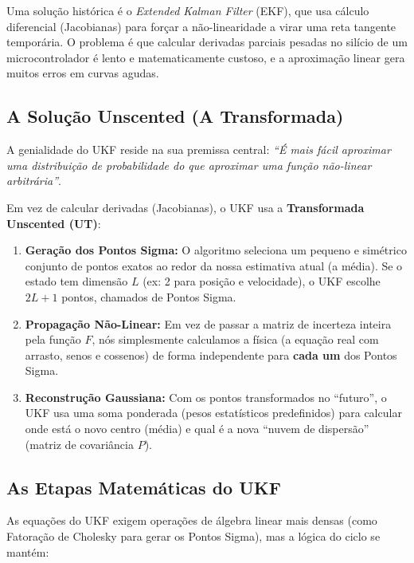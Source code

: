 \documentclass[12pt,a4paper]{article}
\begin{document}
Uma solução histórica é o \textit{Extended Kalman Filter} (EKF), que usa cálculo diferencial (Jacobianas) para forçar a não-linearidade a virar uma reta tangente temporária. O problema é que calcular derivadas parciais pesadas no silício de um microcontrolador é lento e matematicamente custoso, e a aproximação linear gera muitos erros em curvas agudas.

\subsection{A Solução Unscented (A Transformada)}
A genialidade do UKF reside na sua premissa central: \textit{``É mais fácil aproximar uma distribuição de probabilidade do que aproximar uma função não-linear arbitrária''}.

Em vez de calcular derivadas (Jacobianas), o UKF usa a \textbf{Transformada Unscented (UT)}:
\begin{enumerate}
    \item \textbf{Geração dos Pontos Sigma:} O algoritmo seleciona um pequeno e simétrico conjunto de pontos exatos ao redor da nossa estimativa atual (a média). Se o estado tem dimensão $L$ (ex: 2 para posição e velocidade), o UKF escolhe $2L + 1$ pontos, chamados de Pontos Sigma.
    \item \textbf{Propagação Não-Linear:} Em vez de passar a matriz de incerteza inteira pela função $F$, nós simplesmente calculamos a física (a equação real com arrasto, senos e cossenos) de forma independente para \textbf{cada um} dos Pontos Sigma.
    \item \textbf{Reconstrução Gaussiana:} Com os pontos transformados no ``futuro'', o UKF usa uma soma ponderada (pesos estatísticos predefinidos) para calcular onde está o novo centro (média) e qual é a nova ``nuvem de dispersão'' (matriz de covariância $P$).
\end{enumerate}



\subsection{As Etapas Matemáticas do UKF}
As equações do UKF exigem operações de álgebra linear mais densas (como Fatoração de Cholesky para gerar os Pontos Sigma), mas a lógica do ciclo se mantém:
\end{document}
